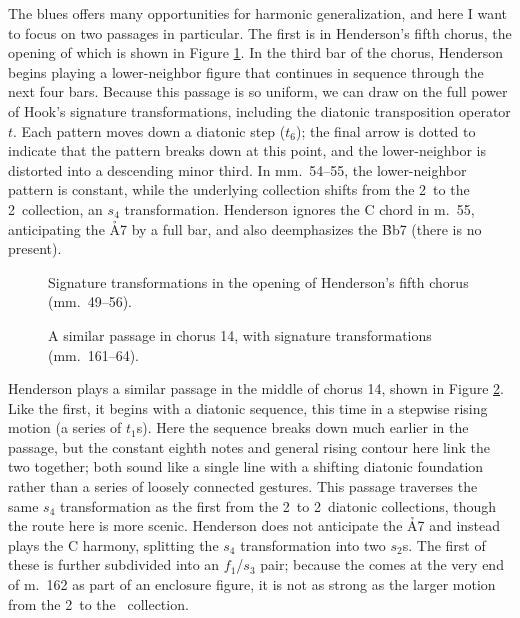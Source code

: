 The blues offers many opportunities for harmonic generalization, and here I
want to focus on two passages in particular. The first is in
Henderson's fifth chorus, the opening of which is shown in Figure
\ref{csa:henderson-chorus-five}. In the third bar of the chorus, Henderson
begins playing a lower-neighbor figure that continues in sequence through the
next four bars. Because this passage is so uniform, we can draw on the full
power of Hook's signature transformations, including the diatonic
transposition operator $t$. Each pattern moves down a diatonic step
($t_6$); the final arrow is dotted to indicate that the pattern breaks down at
this point, and the lower-neighbor is distorted into a descending minor third.
In mm.~54--55, the lower-neighbor pattern is constant, while the underlying
collection shifts from the 2\flat\ to the 2\sharp\ collection, an $s_4$
transformation. Henderson ignores the C chord in m.~55,
anticipating the \h{A7} by a full bar, and also deemphasizes the \h{Bb7}
(there is no \Aflat present).

\begin{figure}[tbp]
  \caption[Signature transformations in the opening of Henderson's fifth
    chorus.]{Signature transformations in the opening of Henderson's fifth
    chorus (mm.~49--56).}
  \label{csa:henderson-chorus-five}
\end{figure}

\begin{figure}[tbp]
  \caption[A similar passage in chorus 14, with signature transformations.]{A
    similar passage in chorus 14, with signature transformations
    (mm.~161--64).}
  \label{csa:henderson-chorus-fourteen}
\end{figure}

Henderson plays a similar passage in the middle of chorus 14, shown in Figure
\ref{csa:henderson-chorus-fourteen}. Like the first, it begins with a diatonic
sequence, this time in a stepwise rising motion (a series of $t_1$s). Here the
sequence breaks down much earlier in the passage, but the constant eighth
notes and general rising contour here link the two together; both sound like a
single line with a shifting diatonic foundation rather than a series of
loosely connected gestures. This passage traverses the same $s_4$
transformation as the first from the 2\flat\ to 2\sharp\ diatonic collections,
though the route here is more scenic. Henderson does not anticipate the \h{A7}
and instead plays the C harmony, splitting the $s_4$ transformation into two
$s_2$s. The first of these is further subdivided into an $f_1$/$s_3$ pair;
because the \Aflat comes at the very end of m.~162 as part of an enclosure
figure, it is not as strong as the larger motion from the 2\flat\ to the \nat\
collection.

